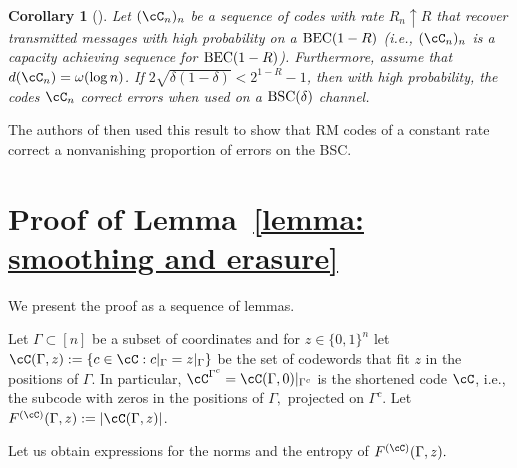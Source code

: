 \documentclass{amsart}
\newtheorem{corollary}[theorem]{Corollary}
\theoremstyle{remark}
\begin{document}
\begin{corollary}[\cite{hkazla2021codes}]\label{cor: BEC capacity achieving codes in BSC} 
Let $(\cC_n)_n$ be a sequence of codes with rate $R_n\uparrow R$ that recover transmitted messages with high probability  on a ${\text{\rm BEC}}(1-R)$ (i.e., $(\cC_n)_n$ is a capacity achieving sequence for ${\text{\rm BEC}}(1-R)$). Furthermore, assume that $d(\cC_n) = \omega(\log n)$. If $2\sqrt{\delta(1-\delta)}<2^{1-R}-1$, then with high probability, the codes $\cC_n$ correct errors when used on a ${\text{\rm BSC}}(\delta)$ channel. 
\end{corollary}

The authors of \cite{hkazla2021codes} then used this result to show that RM codes of a constant rate correct a nonvanishing proportion of errors on the BSC.


\vspace*{.1in}
\section{Proof of Lemma~\ref{lemma: smoothing and erasure}} \label{appendix: proof: lemma: smoothing and erasure}

We present the proof as a sequence of lemmas.

Let  $\Gamma \subset [n]$ be a subset of coordinates and for $z\in\{0,1\}^n$ let $\cC(\Gamma,z):=\{c\in\cC: c|_\Gamma=z|_\Gamma\}$ be the set of codewords that fit $z$ in the positions of $\Gamma.$ 
In particular, $\cC^{\Gamma^c}=\cC(\Gamma,0)|_{\Gamma^c}$ is the shortened code $\cC$, i.e., the subcode
with zeros in the positions of $\Gamma,$ projected on $\Gamma^c.$
Let $F^{(\cC)}(\Gamma,z):=|\cC(\Gamma,z)|$. 

Let us obtain expressions for the norms and the entropy of $F^{(\cC)}(\Gamma,z).$
\end{document}
